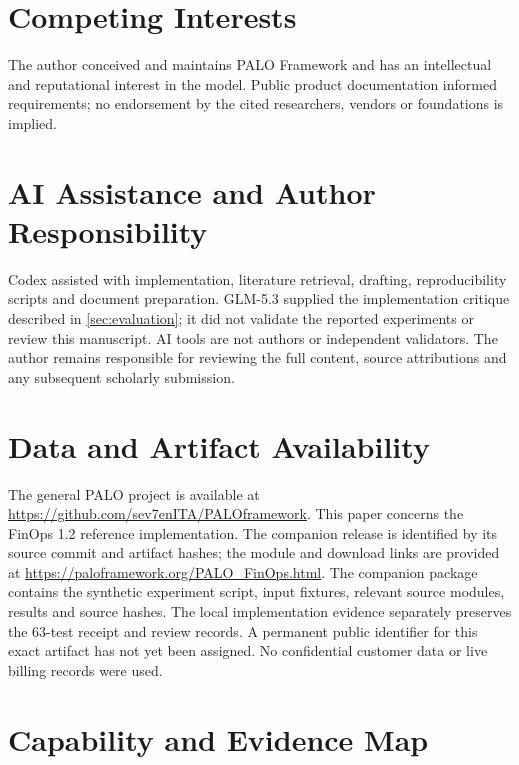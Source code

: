 \documentclass[10pt,twocolumn]{article}
\begin{document}
\section*{Competing Interests}
The author conceived and maintains PALO Framework and has an intellectual and reputational interest in the model. Public product documentation informed requirements; no endorsement by the cited researchers, vendors or foundations is implied.

\section*{AI Assistance and Author Responsibility}
Codex assisted with implementation, literature retrieval, drafting, reproducibility scripts and document preparation. GLM-5.3 supplied the implementation critique described in \cref{sec:evaluation}; it did not validate the reported experiments or review this manuscript. AI tools are not authors or independent validators. The author remains responsible for reviewing the full content, source attributions and any subsequent scholarly submission.

\section*{Data and Artifact Availability}
The general PALO project is available at \url{https://github.com/sev7enITA/PALOframework}. This paper concerns the FinOps 1.2 reference implementation. The companion release is identified by its source commit and artifact hashes; the module and download links are provided at \url{https://paloframework.org/PALO_FinOps.html}. The companion package contains the synthetic experiment script, input fixtures, relevant source modules, results and source hashes. The local implementation evidence separately preserves the 63-test receipt and review records. A permanent public identifier for this exact artifact has not yet been assigned. No confidential customer data or live billing records were used.

\appendix
\section{Capability and Evidence Map}
\label{sec:capabilities}
\end{document}
